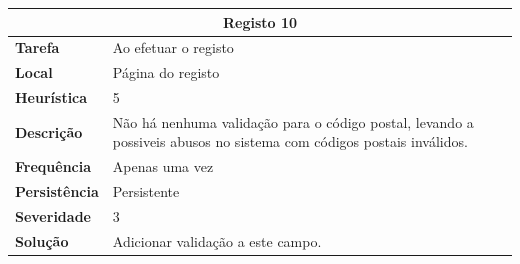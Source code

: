 \documentclass[a4paper,12pt]{article}
\begin{document}
\begin{center}
    \newpage
    \begin{table}[h!]
        \centering
        \begin{tabular}{|m{3cm}|m{12cm}|}
            \hline
            \multicolumn{2}{|c|}{\textbf{Registo 10}}                                                                                                   \\ \hline
            \textbf{Tarefa}       & Ao efetuar o registo                                                                                                \\ \hline
            \textbf{Local}        & Página do registo                                                                                                   \\ \hline
            \textbf{Heurística}   & 5                                                                                                                   \\ \hline
            \textbf{Descrição}    & Não há nenhuma validação para o código postal, levando a possiveis abusos no sistema com códigos postais inválidos. \\ \hline
            \textbf{Frequência}   & Apenas uma vez                                                                                                      \\ \hline
            \textbf{Persistência} & Persistente                                                                                                         \\ \hline
            \textbf{Severidade}   & 3                                                                                                                   \\ \hline
            \textbf{Solução}      & Adicionar validação a este campo.                                                                                   \\ \hline
        \end{tabular}
    \end{table}


\end{center}
\end{document}
